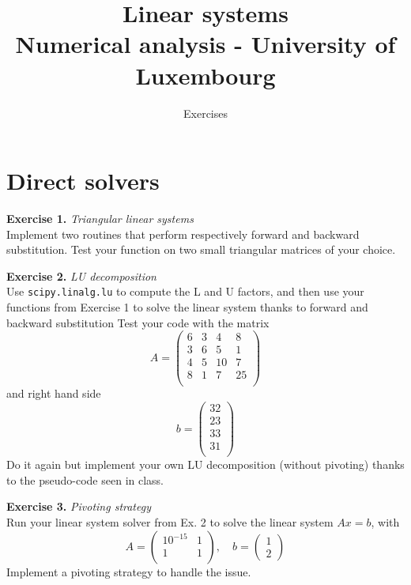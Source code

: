 \documentclass{article}
\title{Linear systems \\[1ex] \large Numerical analysis - University of Luxembourg}
\author{Exercises}
\date{}
\begin{document}
\maketitle

\section*{Direct solvers}
\noindent \textbf{Exercise 1.} \textit{Triangular linear systems} \\
Implement two routines that perform respectively forward and backward substitution.
Test your function on two small triangular matrices of your choice.

\vspace{0.5cm}
\noindent \textbf{Exercise 2.} \textit{LU decomposition} \\
Use \texttt{scipy.linalg.lu} to compute the L and U factors, and then use your functions from Exercise 1 to solve the linear system thanks to forward and backward substitution
Test your code with the matrix
$$ A=\begin{pmatrix}
6 & 3 & 4 & 8 \\
3 & 6 & 5 & 1 \\
4 & 5 & 10 & 7 \\
8 & 1 & 7 & 25 \\
\end{pmatrix} $$
and right hand side 
$$ b=\begin{pmatrix}
32 \\
23 \\
33 \\
31 \\
\end{pmatrix} $$
Do it again but implement your own LU decomposition (without pivoting) thanks to the pseudo-code seen in class.

\vspace{0.5cm}
\noindent \textbf{Exercise 3.} \textit{Pivoting strategy} \\
Run your linear system solver from Ex. 2 to solve the linear system $Ax=b$, with 
$$ A=\begin{pmatrix}
10^{-15} & 1  \\
1 & 1 \\
\end{pmatrix}, \quad b = \begin{pmatrix}
1 \\ 2
\end{pmatrix} $$
Implement a pivoting strategy to handle the issue.
\end{document}
